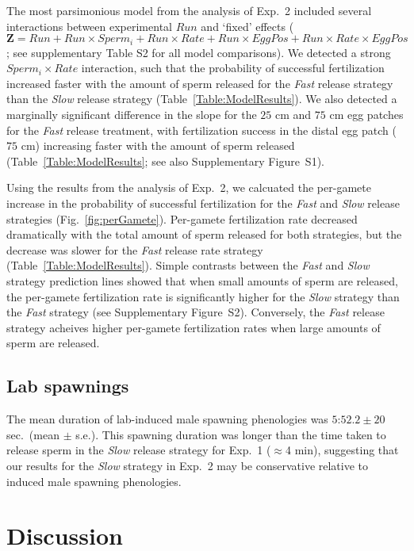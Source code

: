 \documentclass{article}
\begin{document}
	The most parsimonious model from the analysis of Exp.~2 included several interactions between experimental $Run$ and `fixed' effects ($\mathbf{Z} = Run + Run \times Sperm_i + Run \times Rate + Run \times EggPos + Run \times Rate \times EggPos$; see supplementary Table S2 for all model comparisons). We detected a strong $Sperm_i \times Rate$ interaction, such that the probability of successful fertilization increased faster with the amount of sperm released for the \textit{Fast} release strategy than the \textit{Slow} release strategy (Table~\ref{Table:ModelResults}). We also detected a marginally significant difference in the slope for the $25$ cm and $75$ cm egg patches for the \textit{Fast} release treatment, with fertilization success in the distal egg patch ($75$ cm) increasing faster with the amount of sperm released (Table~\ref{Table:ModelResults}; see also Supplementary Figure~S1).

	Using the results from the analysis of Exp.~2, we calcuated the per-gamete increase in the probability of successful fertilization for the \textit{Fast} and \textit{Slow} release strategies (Fig.~\ref{fig:perGamete}). Per-gamete fertilization rate decreased dramatically with the total amount of sperm released for both strategies, but the decrease was slower for the \textit{Fast} release rate strategy (Table~\ref{Table:ModelResults}). Simple contrasts between the \textit{Fast} and \textit{Slow} strategy prediction lines showed that when small amounts of sperm are released, the per-gamete fertilization rate is significantly higher for the \textit{Slow} strategy than the \textit{Fast} strategy (see Supplementary Figure~S2). Conversely, the \textit{Fast} release strategy acheives higher per-gamete fertilization rates when large amounts of sperm are released.

	\subsection*{Lab spawnings}

	The mean duration of lab-induced male spawning phenologies was $5$:$52.2 \pm 20$ sec.~(mean $\pm$ s.e.). This spawning duration was longer than the time taken to release sperm in the \textit{Slow} release strategy for Exp.~1 ($\approx$4 min), suggesting that our results for the \textit{Slow} strategy in Exp.~2 may be conservative relative to induced male spawning phenologies.


\section*{Discussion}
\end{document}
